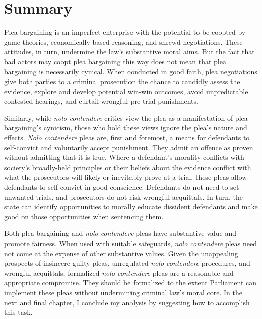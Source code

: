 \section{Summary}

Plea bargaining is an imperfect enterprise with the potential to be coopted by game theories, economically-based reasoning, and shrewd negotiations. These attitudes, in turn, undermine the law's substantive moral aims. But the fact that bad actors may coopt plea bargaining this way does not mean that plea bargaining is necessarily cynical. When conducted in good faith, plea negotiations give both parties to a criminal prosecution the chance to candidly assess the evidence, explore and develop potential win-win outcomes, avoid unpredictable contested hearings, and curtail wrongful pre-trial punishments.

Similarly, while \textit{nolo contendere} critics view the plea as a manifestation of plea bargaining's cynicism, those who hold these views ignore the plea's nature and effects. \textit{Nolo contendere} pleas are, first and foremost, a means for defendants to self-convict and voluntarily accept punishment. They admit an offence as proven without admitting that it is true. Where a defendant's morality conflicts with society's broadly-held principles or their beliefs about the evidence conflict with what the prosecutors will likely or inevitably prove at a trial, these pleas allow defendants to self-convict in good conscience. Defendants do not need to set unwanted trials, and prosecutors do not risk wrongful acquittals. In turn, the state can identify opportunities to morally educate dissident defendants and make good on those opportunities when sentencing them.

Both plea bargaining and \textit{nolo contendere} pleas have substantive value and promote fairness. When used with suitable safeguards, \textit{nolo contendere} pleas need not come at the expense of other substantive values. Given the unappealing prospects of insincere guilty pleas, unregulated \textit{nolo contendere} procedures, and wrongful acquittals, formalized \textit{nolo contendere} pleas are a reasonable and appropriate compromise. They should be formalized to the extent Parliament can implement these pleas without undermining criminal law's moral core. In the next and final chapter, I conclude my analysis by suggesting how to accomplish this task.